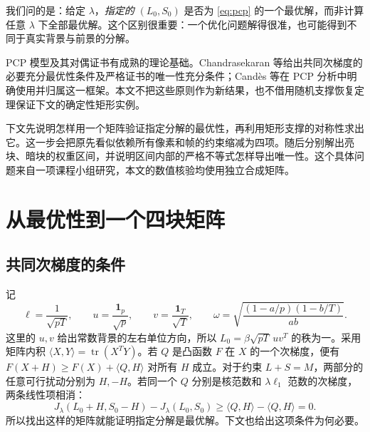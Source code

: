 \documentclass[UTF8,fontset=none,zihao=-4,a4paper]{ctexart}
\theoremstyle{plainzh}
\newcommand{\one}{\bm 1}
\numberwithin{equation}{section}
\begin{document}
我们问的是：给定 $\lambda$，\emph{指定的} $(L_0,S_0)$ 是否为 \eqref{eq:pcp} 的一个最优解，而非计算任意 $\lambda$ 下全部最优解。这个区别很重要：一个优化问题解得很准，也可能得到不同于真实背景与前景的分解。

PCP 模型及其对偶证书有成熟的理论基础。Chandrasekaran 等\cite[第 4.1 节、Proposition 2]{CSPW}给出共同次梯度的必要充分最优性条件及严格证书的唯一性充分条件；Cand\`es 等\cite[第 2.3 节、Lemma 2.4]{CLMW}在 PCP 分析中明确使用并归属这一框架。本文不把这些原则作为新结果，也不借用随机支撑恢复定理保证下文的确定性矩形实例。

下文先说明怎样用一个矩阵验证指定分解的最优性，再利用矩形支撑的对称性求出它。这一步会把原先看似依赖所有像素和帧的约束缩减为四项。随后分别解出亮块、暗块的权重区间，并说明区间内部的严格不等式怎样导出唯一性。这个具体问题来自一项课程小组研究，本文的数值核验均使用独立合成矩阵。

\section{从最优性到一个四块矩阵}

\subsection{共同次梯度的条件}

记
\begin{equation}\label{eq:defs}
 \ell=\frac1{\sqrt{pT}},\qquad
 u=\frac{\one_p}{\sqrt p},\qquad v=\frac{\one_T}{\sqrt T},\qquad
 \omega=\sqrt{\frac{(1-a/p)(1-b/T)}{ab}}.
\end{equation}
这里的 \(u,v\) 给出常数背景的左右单位方向，所以 \(L_0=\beta\sqrt{pT}\,uv^T\) 的秩为一。采用矩阵内积 \(\langle X,Y\rangle=\operatorname{tr}(X^TY)\)。若 \(Q\) 是凸函数 \(F\) 在 \(X\) 的一个次梯度，便有 \(F(X+H)\ge F(X)+\langle Q,H\rangle\) 对所有 \(H\) 成立。对于约束 \(L+S=M\)，两部分的任意可行扰动分别为 \(H,-H\)。若同一个 \(Q\) 分别是核范数和 \(\lambda\ell_1\) 范数的次梯度，两条线性项相消：
\[
 J_\lambda(L_0+H,S_0-H)-J_\lambda(L_0,S_0)
 \ge\langle Q,H\rangle-\langle Q,H\rangle=0.
\]
所以找出这样的矩阵就能证明指定分解是最优解。下文也给出这项条件为何必要。
\end{document}

